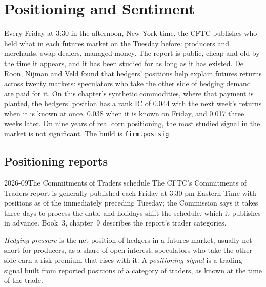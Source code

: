 \chapter{Positioning and Sentiment}\label{ch:s1:positioning-and-sentiment}

Every Friday at 3:30 in the afternoon, New York time, the CFTC publishes who held what in each futures market on the Tuesday before: producers and
merchants, swap dealers, managed money. The report is public, cheap and old by the time it appears, and it has been studied for as long as it has
existed. De Roon, Nijman and Veld found that hedgers' positions help explain futures returns across twenty markets: speculators who take the other side
of hedging demand are paid for it. On this chapter's synthetic commodities, where that payment is planted, the hedgers' position has a rank IC of 0.044
with the next week's returns when it is known at once, 0.038 when it is known on Friday, and 0.017 three weeks later. On nine years of real corn
positioning, the most studied signal in the market is not significant. The build is \texttt{firm.posisig}.

\section{Positioning reports}

\begin{dated}{2026-09}{The Commitments of Traders schedule}\label{dat:s1:positioning-and-sentiment:cot}
The CFTC's Commitments of Traders report is generally published each Friday at 3:30 pm Eastern Time with positions as of the immediately preceding
Tuesday; the Commission says it takes three days to process the data, and holidays shift the schedule, which it publishes in advance. Book~3,
chapter~9 describes the report's trader categories.
\end{dated}

\begin{definition}\label{def:s1:positioning-and-sentiment:hedging}
\emph{Hedging pressure} is the net position of hedgers in a futures market, usually net short for producers, as a share of
open interest; speculators who take the other side earn a risk premium that rises with it. A \emph{positioning signal} is a
trading signal built from reported positions of a category of traders, as known at the time of the trade.
\end{definition}

